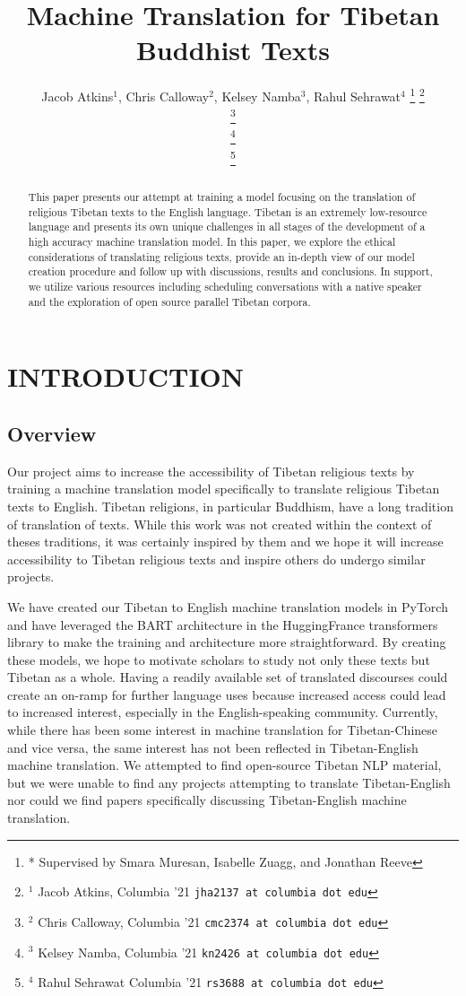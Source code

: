 \documentclass[letterpaper, 12 pt, conference]{ieeeconf}  %
\title{\LARGE \bf
Machine Translation for Tibetan Buddhist Texts
}
\author{ Jacob Atkins$^{1}$, Chris Calloway$^{2}$, Kelsey Namba$^{3}$, Rahul Sehrawat$^{4}$%
\thanks{* Supervised by Smara Muresan, Isabelle Zuagg, and Jonathan Reeve}%
\thanks{$^{1}$ Jacob Atkins, Columbia '21
        {\tt\small jha2137 at columbia dot edu}}%
        
\thanks{$^{2}$ Chris Calloway, Columbia '21
        {\tt\small cmc2374 at columbia dot edu}}%
        
\thanks{$^{3}$ Kelsey Namba, Columbia '21
        {\tt\small kn2426 at columbia dot edu}}%
        
        
\thanks{$^{4}$ Rahul Sehrawat Columbia '21
        {\tt\small rs3688 at columbia dot edu}}%





}
\begin{document}
\maketitle
\thispagestyle{empty}
\pagestyle{empty}


\begin{abstract}

This paper presents our attempt at training a model focusing on the translation of religious Tibetan texts to the English language. Tibetan is an extremely low-resource language and presents its own unique challenges in all stages of the development of a high accuracy machine translation model. In this paper, we explore the ethical considerations of translating religious texts, provide an in-depth view of our model creation procedure and follow up with discussions, results and conclusions. In support, we utilize various resources including scheduling conversations with a native speaker and the exploration of open source parallel Tibetan corpora.



\end{abstract}


\section{INTRODUCTION}

\subsection{Overview}

Our project aims to increase the accessibility of Tibetan religious texts by training a machine translation model specifically to translate religious Tibetan texts to English. Tibetan religions, in particular Buddhism, have a long tradition of translation of texts. While this work was not created within the context of theses traditions, it was certainly inspired by them and we hope it will increase accessibility to Tibetan religious texts and inspire others do undergo similar projects.

We have created our Tibetan to English machine translation models in PyTorch and have leveraged the BART architecture in the HuggingFrance transformers library to make the training and architecture more straightforward. By creating these models, we hope to motivate scholars to study not only these texts but Tibetan as a whole. Having a readily available set of translated discourses could create an on-ramp for further language uses because increased access could lead to increased interest, especially in the English-speaking community. 
Currently, while there has been some interest in machine translation for Tibetan-Chinese and vice versa, the same interest has not been reflected in Tibetan-English machine translation. We attempted to find open-source Tibetan NLP material, but we were unable to find any projects attempting to translate Tibetan-English nor could we find papers specifically discussing Tibetan-English machine translation.
\end{document}
